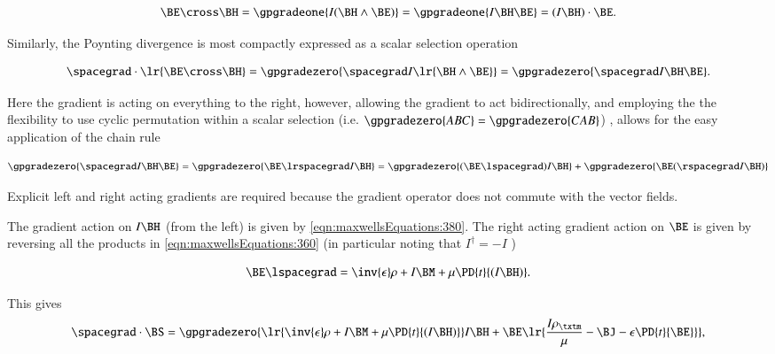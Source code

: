 \begin{equation}\label{eqn:maxwellsEquations:780}
\BE \cross \BH
=
\gpgradeone{ I (\BH \wedge \BE) }
=
\gpgradeone{ I \BH \BE }
=
(I \BH) \cdot \BE.
\end{equation}

Similarly, the Poynting divergence is most compactly expressed as a scalar selection operation

\begin{equation}\label{eqn:maxwellsEquations:640}
\spacegrad \cdot \lr{ \BE \cross \BH }
=
\gpgradezero{ \spacegrad I \lr{ \BH \wedge \BE } }
=
\gpgradezero{ \spacegrad I \BH \BE }.
\end{equation}

Here the gradient is acting on everything to the right, however, allowing the gradient to act bidirectionally, and employing the
the flexibility to use cyclic permutation within a scalar selection
(i.e. \(\gpgradezero{ABC} = \gpgradezero{CAB}\))
, allows for the easy application of the chain rule

\begin{dmath}\label{eqn:maxwellsEquations:760}
\gpgradezero{ \spacegrad I \BH \BE }
=
\gpgradezero{ \BE \lrspacegrad I \BH }
=
\gpgradezero{ (\BE \lspacegrad) I \BH }
+\gpgradezero{ \BE (\rspacegrad I \BH) }
\end{dmath}

Explicit left and right acting gradients are required because the gradient operator does not commute with the vector fields.

The gradient action on \( I \BH \) (from the left) is given by
\cref{eqn:maxwellsEquations:380}.  The right acting gradient action on \( \BE \) is given by reversing all the products in
\cref{eqn:maxwellsEquations:360} (in particular noting that \( I^\dagger = -I \) )

\begin{dmath}\label{eqn:maxwellsEquations:660}
\BE \lspacegrad = \inv{\epsilon} \rho + I \BM + \mu \PD{t}{(I\BH)}.
\end{dmath}

This gives
\begin{dmath}\label{eqn:maxwellsEquations:680}
\spacegrad \cdot \BS
=
\gpgradezero
{
\lr{ \inv{\epsilon} \rho + I \BM + \mu \PD{t}{(I\BH)} } I \BH
+
\BE
\lr
{
\frac{I \rho_\txtm}{\mu} - \BJ - \epsilon \PD{t}{\BE}
}
}
,
\end{dmath}


